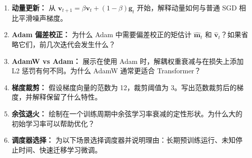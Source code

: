 \begin{enumerate}
    \item \textbf{动量更新：} 从 $\mathbf{v}_{t+1} = \beta \mathbf{v}_t + (1-\beta)\mathbf{g}_t$ 开始，解释动量如何与普通 SGD 相比平滑噪声梯度。

    \item \textbf{Adam 偏差校正：} 为什么 Adam 中需要偏差校正的矩估计 $\hat{\mathbf{m}}_t$ 和 $\hat{\mathbf{v}}_t$？如果省略它们，前几次迭代会发生什么？

    \item \textbf{AdamW vs Adam：} 展示在使用 Adam 时，解耦权重衰减与在损失上添加 L2 惩罚有何不同。为什么 AdamW 通常更适合 Transformer？

    \item \textbf{梯度裁剪：} 假设梯度向量的范数为 12，裁剪阈值为 3。写出范数裁剪后的梯度，并解释保留了什么特性。

    \item \textbf{余弦退火：} 绘制在一个训练周期中余弦学习率衰减的定性形状。为什么大的初始学习率可以帮助优化？

    \item \textbf{调度器选择：} 为以下场景选择调度器并说明理由：长期预训练运行、未知停止时间、快速迁移学习微调。
\end{enumerate}

